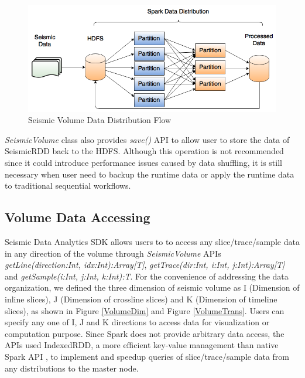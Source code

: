 \begin{figure}[h]
\centering
\includegraphics[scale=0.6]{figures/datadist.png}
\caption{Seismic Volume Data Distribution Flow}
\label{datadist}
\end{figure}

\emph{SeismicVolume} class also provides \emph{save()} API to allow user to store the data of SeismicRDD back to the HDFS. Although this operation is not recommended since it could introduce performance issues caused by data shuffling, it is still necessary when user need to backup the runtime data or apply the runtime data to traditional sequential workflows.


\subsection{Volume Data Accessing}

Seismic Data Analytics SDK allows users to to access any slice/trace/sample data in any direction of the volume through \emph{SeismicVolume} APIs \emph{getLine(direction:Int, idx:Int):Array[T]}, \emph{getTrace(dir:Int, i:Int, j:Int):Array[T]} and \emph{getSample(i:Int, j:Int, k:Int):T}. 
For the convenience of addressing the data organization, we defined the three dimension of seismic volume as I (Dimension of inline slices), J (Dimension of crossline slices) and K (Dimension of timeline slices), as shown in Figure \ref{VolumeDim} and Figure \ref{VolumeTrans}. Users can specify any one of I, J and K directions to access data for visualization or computation purpose. Since Spark does not provide arbitrary data access, the APIs used IndexedRDD, a more efficient key-value management than native Spark API \cite{IndexedRDD}, to implement and speedup queries of slice/trace/sample data from any distributions to the master node.

